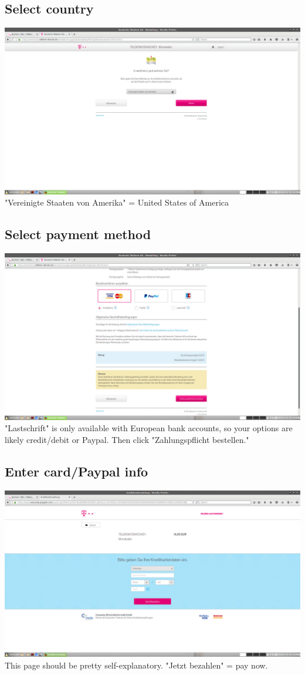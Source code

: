 \documentclass[12pt]{article}
\begin{document}
	\subsection{Select country}
		\includegraphics[width=\textwidth]{05-country.png}
		"Vereinigte Staaten von Amerika" = United States of America
	
	\subsection{Select payment method}
		\includegraphics[width=\textwidth]{06-payment_method.png}
		"Lastschrift" is only available with European bank accounts, so your options are likely
		credit/debit or Paypal. Then click "Zahlungspflicht bestellen."
	
	\subsection{Enter card/Paypal info}
		\includegraphics[width=\textwidth]{07-card_info.png}
		This page should be pretty self-explanatory. "Jetzt bezahlen" = pay now.
\end{document}
